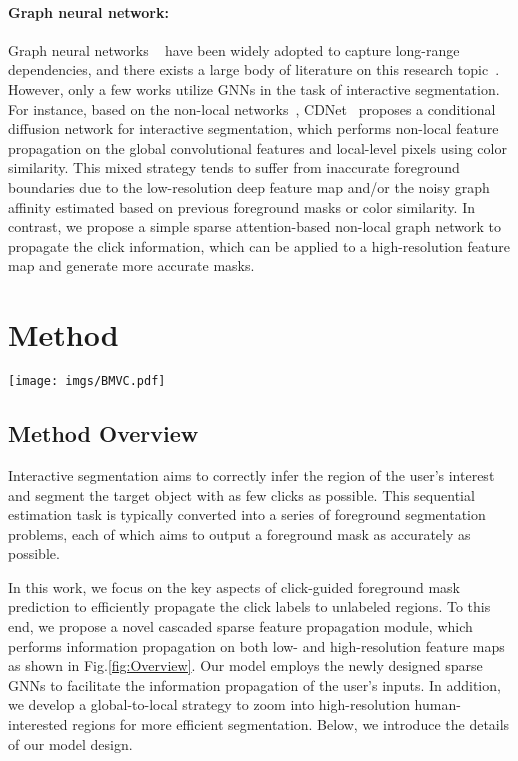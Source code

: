 \documentclass{bmvc2k}
\begin{document}
\paragraph{Graph neural network:}
Graph neural networks ~\cite{gori2005new,scarselli2008graph} have been widely adopted to capture long-range dependencies, and there exists a large body of literature on this research topic~\cite{wu2020comprehensive}. However, only a few works utilize GNNs in the task of interactive segmentation. For instance, based on the non-local networks~\cite{wang2018non}, CDNet~\cite{chen2021conditional} proposes a conditional diffusion network for interactive segmentation, which performs non-local feature propagation on the global convolutional features and local-level pixels using color similarity.
This mixed strategy tends to suffer from inaccurate foreground boundaries due to the low-resolution deep feature map and/or the noisy graph affinity estimated based on previous foreground masks or color similarity. In contrast, we propose a simple sparse attention-based non-local graph network to propagate the click information,  which can be applied to a high-resolution feature map and generate more accurate masks. \section{Method}
\begin{figure*}[!t]
	\centering
	\texttt{[image: imgs/BMVC.pdf]}
	\caption{The overall architecture of cascaded sparse feature propagation network (CSFP). We take as input an image, the previous step probability map and a set of human clicks. In the feature space, to fully utilize human-provided information, we select human-provided click information and propagate that information by a cascaded of sparse graphs.
}
	\label{fig:Overview}
\end{figure*}
\subsection{Method Overview}\label{overview}
Interactive segmentation aims to correctly infer the region of the user's interest and segment the target object with as few clicks as possible. This sequential estimation task is typically converted into a series of foreground segmentation problems, each of which aims to output a foreground mask as accurately as possible.


In this work, we focus on the key aspects of click-guided foreground mask prediction to efficiently propagate the click labels to unlabeled regions. To this end, we propose a novel cascaded sparse feature propagation module, which performs information propagation on both low- and high-resolution feature maps as shown in Fig.\ref{fig:Overview}. Our model employs the newly designed sparse GNNs to facilitate the information propagation of the user's inputs. In addition, we develop a global-to-local strategy to zoom into high-resolution human-interested regions for more efficient segmentation. Below, we introduce the details of our model design.
\end{document}
